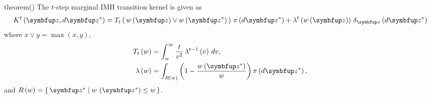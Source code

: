 
\begin{theoremEnd}{theorem}\label{thm:imh_exact_kernel}(\citealt[Theorem 1]{Smith96exacttransition})
  The \(t\)-step marginal IMH transition kernel is given as
  {\small
    \[
    K^t\left(\vz, d\vz^*\right) 
    = T_t\left(\, w\left(\vz\right) \vee w\left(\vz^*\right)\,\right) \, \pi\left(d\vz^*\right)
    + \lambda^t\left(w\left(\vz\right)\right) \, \delta_{\vz}\left(d\vz^*\right)
    \]
  }%
  where \(x \vee y = \max\left(x, y\right)\),
  {\small%
  \begin{align*}
  T_t\left(w\right)     &= \int_w^{\infty} \frac{t}{v^2} \, \lambda^{t-1}\left(v\right)\,dv, \; \\
  \lambda\left(w\right) &= \int_{R\left(w\right)} \left( 1 - \frac{w\left(\vz^*\right)}{w}  \right) \pi\left(d\vz^*\right),
  \end{align*}
  and \(R\left(w\right) = \{\, \vz^* \mid w\,\left(\vz^*\right) \leq w \,\}\).
  }
\end{theoremEnd}

